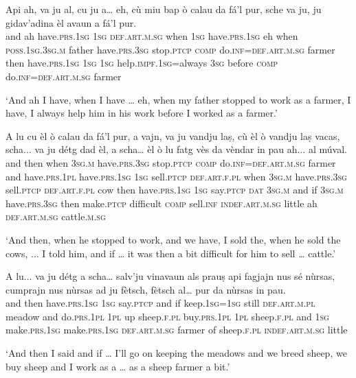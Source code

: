 \begin{linenumbers}
\gll  Api ah, va ju al, cu ju a… eh, cù miu bap ò calau da fá’l pur, sche va ju, ju gidav’adina èl avaun a fá’l pur.  \\
and ah  have.\textsc{prs.1sg} \textsc{1sg} \textsc{def.art.m.sg} when \textsc{1sg}  have.\textsc{prs.1sg} eh  when \textsc{poss.1sg.3sg.m} father have.\textsc{prs.3sg} stop.\textsc{ptcp}  \textsc{comp} do.\textsc{inf=def.art.m.sg} farmer then have.\textsc{prs.1sg} \textsc{1sg} \textsc{1sg} help.\textsc{impf.1sg=}always \textsc{3sg} before \textsc{comp}  do.\textsc{inf=def.art.m.sg} farmer \\
\end{linenumbers}
\medskip
\glt `And ah I have, when I have … eh, when my father stopped to work as a farmer, I have, I always help him in his work before I worked as a farmer.'
\medskip

\begin{linenumbers}
\gll  A lu cu èl ò calau da fá’l pur, a vajn, va ju vandju laṣ, cù èl ò vandju laṣ vacas, scha... va ju détg dad èl, a scha… èl ò lu fatg vès da vèndar in pau ah... al múval.\\
and then when \textsc{3sg.m} have.\textsc{prs.3sg} stop.\textsc{ptcp} \textsc{comp}  do.\textsc{inf=def.art.m.sg} farmer and  have.\textsc{prs.1pl} have.\textsc{prs.1sg} \textsc{1sg} sell.\textsc{ptcp}  \textsc{def.art.f.pl} when \textsc{3sg.m} have.\textsc{prs.3sg} sell.\textsc{ptcp}  \textsc{def.art.f.pl} cow then have.\textsc{prs.1sg} \textsc{1sg} say.\textsc{ptcp}  \textsc{dat} \textsc{3sg.m} and if  \textsc{3sg.m} have.\textsc{prs.3sg} then make.\textsc{ptcp} difficult \textsc{comp} sell.\textsc{inf} \textsc{indef.art.m.sg} little ah \textsc{def.art.m.sg} cattle.\textsc{m.sg} \\
\end{linenumbers} 
\medskip
\glt `And then, when he stopped to work, and we have, I sold the, when he sold the cows, ... I told him, and if … it was then a bit difficult for him to sell … cattle.'
\medskip

\begin{linenumbers}
\gll  A lu... va ju détg a scha… salv’ju vinavaun als prauṣ api fagjajn nus sé nùrsas, cumprajn nus nùrsas ad ju fètsch, fètsch al… pur da nùrsas in pau.  \\
and then have.\textsc{prs.1sg} \textsc{1sg} say.\textsc{ptcp} and if keep.\textsc{1sg=1sg} still  \textsc{def.art.m.pl} meadow and do.\textsc{prs.1pl} \textsc{1pl} up sheep.\textsc{f.pl}  buy.\textsc{prs.1pl} \textsc{1pl} sheep.\textsc{f.pl} and \textsc{1sg}  make.\textsc{prs.1sg} make.\textsc{prs.1sg} \textsc{def.art.m.sg} farmer of sheep.\textsc{f.pl} \textsc{indef.art.m.sg} little\\
\end{linenumbers}
\medskip
\glt `And then I said and if …  I'll go on keeping the meadows and we breed sheep, we buy sheep and I work as a … as a sheep farmer a bit.'
\medskip

